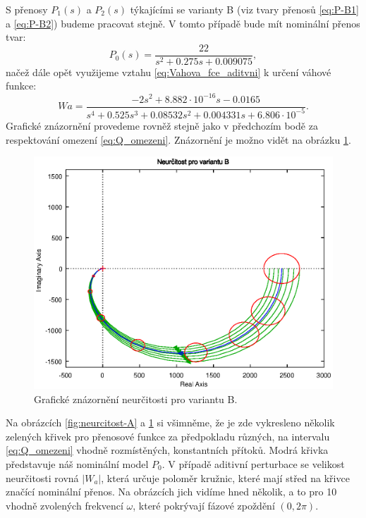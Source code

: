 \documentclass[a4paper,11pt]{article}
\begin{document}
S přenosy $ P_{1}\left ( s \right ) $ a $ P_{2}\left ( s \right ) $ týkajícími se varianty B (viz tvary přenosů \ref{eq:P-B1} a \ref{eq:P-B2}) budeme pracovat stejně. V tomto případě bude mít nominální přenos tvar:
\begin{equation}\label{eq:P-B0} 
P_{0}\left ( s \right ) =\frac{22}{s^{2} + 0.275 s + 0.009075},
\end{equation}
načež dále opět využijeme vztahu \ref{eq:Vahova_fce_aditvni} k určení váhové funkce:
\begin{equation}\label{eq:Wa-B}
Wa = \frac{-2s^{2} + 8.882\cdot 10^{-16}s - 0.0165}{s^{4} + 0.525 s^{3} + 0.08532 s^{2} + 0.004331 s + 6.806\cdot 10^{-5}}.
\end{equation}
Grafické znázornění provedeme rovněž stejně jako v předchozím bodě za respektování omezení \ref{eq:Q_omezeni}. Znázornění je možno vidět na obrázku \ref{fig:neurcitost-B}.
\begin{figure}[htbp]
	\begin{center}
	\includegraphics[scale = 1.0]{obrazky/neurcitostB.eps}
	\caption{Grafické znázornění neurčitosti pro variantu B.}
	\label{fig:neurcitost-B}
	\end{center}
\end{figure}

\newpage
Na obrázcích \ref{fig:neurcitost-A} a \ref{fig:neurcitost-B} si všimněme, že je zde vykresleno několik zelených křivek pro přenosové funkce za předpokladu různých, na intervalu \ref{eq:Q_omezeni} vhodně rozmístěných, konstantních přítoků. Modrá křivka představuje náš nominální model $ P_{0} $. V případě aditivní perturbace se velikost neurčitosti rovná $ \left | W_{a} \right | $, která určuje poloměr kružnic, které mají střed na křivce značící nominální přenos. Na obrázcích jich vidíme hned několik, a to pro 10 vhodně zvolených frekvencí $ \omega $, které pokrývají fázové zpoždění $ \left ( 0, 2\pi  \right ) $.
\end{document}
